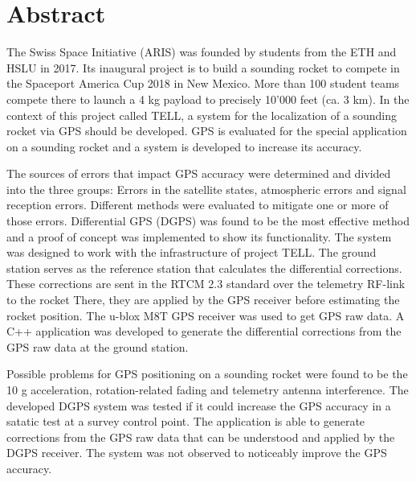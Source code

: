 \chapter*{Abstract}

The Swiss Space Initiative (ARIS) was founded by students from the ETH and HSLU in 2017.
Its inaugural project is to build a sounding rocket to compete in the Spaceport America Cup 2018 in New Mexico.
More than 100 student teams compete there to launch a 4 kg payload to precisely 10'000 feet (ca. 3 km).
In the context of this project called TELL, a system for the localization of a sounding rocket via GPS should be developed.
GPS is evaluated for the special application on a sounding rocket and a system is developed to increase its accuracy.

The sources of errors that impact GPS accuracy were determined and divided into the three groups: Errors in the satellite states, atmospheric errors and signal reception errors.
Different methods were evaluated to mitigate one or more of those errors.
Differential GPS (DGPS) was found to be the most effective method and a proof of concept was implemented to show its functionality.
The system was designed to work with the infrastructure of project TELL.
The ground station serves as the reference station that calculates the differential corrections.
These corrections are sent in the RTCM 2.3 standard over the telemetry RF-link to the rocket
There, they are applied by the GPS receiver before estimating the rocket position.
The u-blox M8T GPS receiver was used to get GPS raw data.
A C++ application was developed to generate the differential corrections from the GPS raw data at the ground station.

Possible problems for GPS positioning on a sounding rocket were found to be the 10 g acceleration, rotation-related fading and telemetry antenna interference.
The developed DGPS system was tested if it could increase the GPS accuracy in a satatic test at a survey control point.
The application is able to generate corrections from the GPS raw data that can be understood and applied by the DGPS receiver.
The system was not observed to noticeably improve the GPS accuracy.